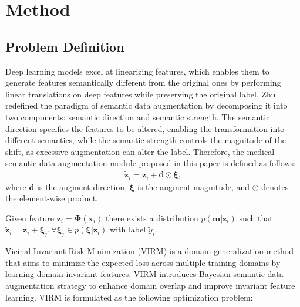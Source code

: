\section{Method}
\label{sec:method}

\subsection{Problem Definition}
\label{sec:medvirm}

Deep learning models excel at linearizing features\cite{upchurch2017deep}, which enables them to generate features semantically different from the original ones by performing linear translations on deep features while preserving the original label\cite{ISDA}. 
Zhu \etal \cite{zhu2024bayesian} redefined the paradigm of semantic data augmentation by decomposing it into two components: semantic direction and semantic strength. 
The semantic direction specifies the features to be altered, enabling the transformation into different semantics, while the semantic strength controls the magnitude of the shift, as excessive augmentation can alter the label. 
Therefore, the medical semantic data augmentation module proposed in this paper is defined as follows:
\begin{equation}
	\begin{aligned}
		\tilde{\mathbf{z}}_i = \mathbf{z}_i + \mathbf{d} \odot \mathbf{\xi},
	\end{aligned}
	\label{eq:sda}
\end{equation}
where $\mathbf{d}$ is the augment direction, $\mathbf{\xi}$ is the augment magnitude, and $\odot$ denotes the element-wise product.

Given feature $\mathbf{z}_i = \mathbf{\Phi}(\mathbf{x}_i)$ there exists a distribution $p(\mathbf{m}|\mathbf{z}_i)$ 
such that $\tilde{\mathbf{z}}_i =\mathbf{z}_i + \mathbf{\xi}_j, \forall \mathbf{\xi}_j \in p(\mathbf{\xi}|\mathbf{z}_i)$ with label $\tilde{y}_i$.

Vicinal Invariant Risk Minimization (VIRM)\cite{zhu2024enlarging}  is a domain generalization method that aims to minimize the expected loss across multiple training domains by learning domain-invariant features.
VIRM introduces Bayesian semantic data augmentation\cite{zhu2024bayesian} strategy to enhance domain overlap and improve invariant feature learning.
VIRM is formulated as the following optimization problem:


